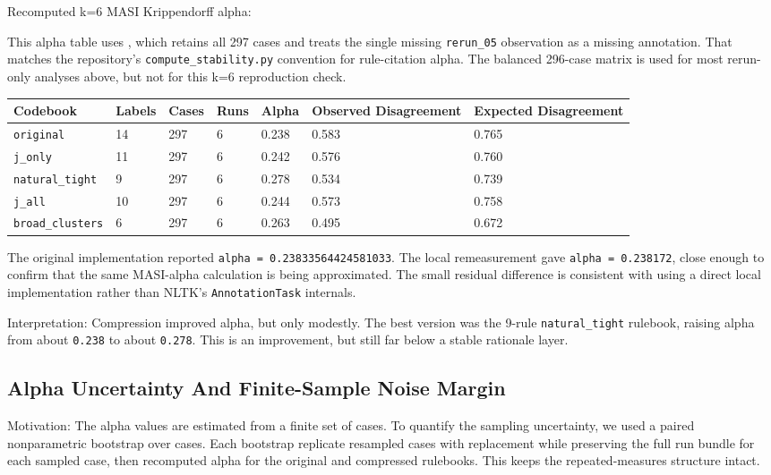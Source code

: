 \documentclass[11pt]{article}
\begin{document}
Recomputed k=6 MASI Krippendorff alpha:

This alpha table uses \href{../data/rule_incidence_seed_and_reruns_available.csv}{}, which retains all 297 cases and treats the single missing \texttt{rerun\_05} observation as a missing annotation. That matches the repository's \texttt{compute\_stability.py} convention for rule-citation alpha. The balanced 296-case matrix is used for most rerun-only analyses above, but not for this k=6 reproduction check.

\begin{longtable}{L{0.22\textwidth} R{0.09\textwidth} R{0.09\textwidth} R{0.08\textwidth} R{0.10\textwidth} R{0.16\textwidth} R{0.16\textwidth}}
\toprule
Codebook & Labels & Cases & Runs & Alpha & Observed Disagreement & Expected Disagreement \\
\midrule
\endhead
\texttt{original} & 14 & 297 & 6 & 0.238 & 0.583 & 0.765 \\
\texttt{j\_only} & 11 & 297 & 6 & 0.242 & 0.576 & 0.760 \\
\texttt{natural\_tight} & 9 & 297 & 6 & 0.278 & 0.534 & 0.739 \\
\texttt{j\_all} & 10 & 297 & 6 & 0.244 & 0.573 & 0.758 \\
\texttt{broad\_clusters} & 6 & 297 & 6 & 0.263 & 0.495 & 0.672 \\
\bottomrule
\end{longtable}

The original implementation reported \texttt{alpha = 0.23833564424581033}. The local remeasurement gave \texttt{alpha = 0.238172}, close enough to confirm that the same MASI-alpha calculation is being approximated. The small residual difference is consistent with using a direct local implementation rather than NLTK's \texttt{AnnotationTask} internals.

Interpretation: Compression improved alpha, but only modestly. The best version was the 9-rule \texttt{natural\_tight} rulebook, raising alpha from about \texttt{0.238} to about \texttt{0.278}. This is an improvement, but still far below a stable rationale layer.

\subsection*{Alpha Uncertainty And Finite-Sample Noise Margin}

Motivation: The alpha values are estimated from a finite set of cases. To quantify the sampling uncertainty, we used a paired nonparametric bootstrap over cases. Each bootstrap replicate resampled cases with replacement while preserving the full run bundle for each sampled case, then recomputed alpha for the original and compressed rulebooks. This keeps the repeated-measures structure intact.
\end{document}
